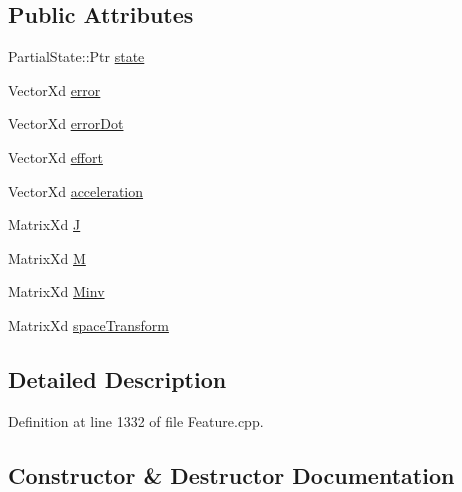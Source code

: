 \subsection*{Public Attributes}
\begin{DoxyCompactItemize}
\item 
Partial\+State\+::\+Ptr \hyperlink{structocra_1_1PartialStateFeature_1_1Pimpl_a780cc4ecc5de8f231684ffdd394aa31a}{state}
\item 
Vector\+Xd \hyperlink{structocra_1_1PartialStateFeature_1_1Pimpl_a92618339173100da4f1759fca1c5de69}{error}
\item 
Vector\+Xd \hyperlink{structocra_1_1PartialStateFeature_1_1Pimpl_a761ba2024bc9792be9d3317ac0e7006e}{error\+Dot}
\item 
Vector\+Xd \hyperlink{structocra_1_1PartialStateFeature_1_1Pimpl_a9339429835a3f17dc250ebcb1a417de8}{effort}
\item 
Vector\+Xd \hyperlink{structocra_1_1PartialStateFeature_1_1Pimpl_a513530c5f57ebdd9b49fe5c7af683378}{acceleration}
\item 
Matrix\+Xd \hyperlink{structocra_1_1PartialStateFeature_1_1Pimpl_aa1bea74398a6c6774e4178c9a07585fc}{J}
\item 
Matrix\+Xd \hyperlink{structocra_1_1PartialStateFeature_1_1Pimpl_a72c1103a7217a32b0c3a987ee55ae4b8}{M}
\item 
Matrix\+Xd \hyperlink{structocra_1_1PartialStateFeature_1_1Pimpl_a7e2b177fca112bbeb8055361c90d333e}{Minv}
\item 
Matrix\+Xd \hyperlink{structocra_1_1PartialStateFeature_1_1Pimpl_aadd03df1276aa00d2efd8679c5cecb1a}{space\+Transform}
\end{DoxyCompactItemize}


\subsection{Detailed Description}


Definition at line 1332 of file Feature.\+cpp.



\subsection{Constructor \& Destructor Documentation}
